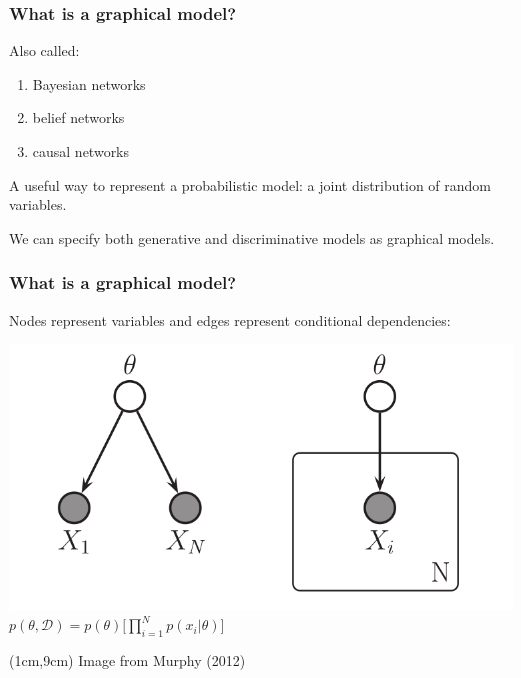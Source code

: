 \documentclass[mathserif]{beamer}
\begin{document}
\begin{frame}

    \frametitle{What is a graphical model?}
    \small
    \begin{block}{Also called:}
    \begin{enumerate}
        \item Bayesian networks
        \item belief networks
        \item causal networks
    \end{enumerate}
    \end{block}
    \begin{block}{A useful way to represent a probabilistic model: a joint distribution of random variables.}
    \end{block}
    We can specify both generative and discriminative models as graphical models. 
\end{frame}


\begin{frame}

    \frametitle{What is a graphical model?}
    \small
    \begin{block}{Nodes represent variables and edges represent conditional dependencies:}
    \begin{center}
    \includegraphics[scale=0.3]{figures/graphical_model.png}\\
        \medskip
        $p(\theta,\mathcal{D}) = p(\theta) \Big[ \displaystyle\prod^N_{i=1} p(x_i|\theta) \Big]$
    \end{center}
    \end{block}
    \begin{textblock*}{10cm}(1cm,9cm)
    \tiny Image from Murphy (2012)
    \end{textblock*}
\end{frame}
\end{document}
